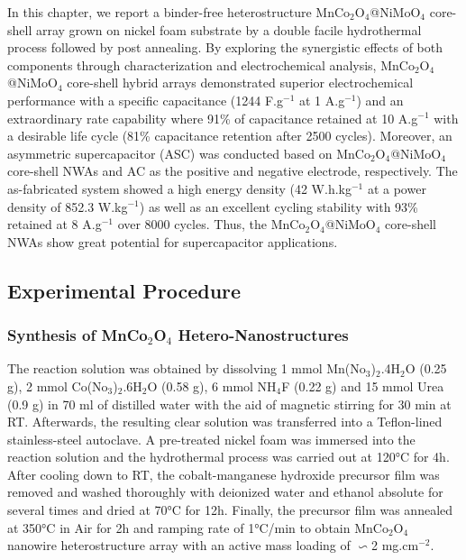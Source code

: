 \documentclass[reprint,amsmath,amssymb,aps,floatfix,
]{revtex4-2}
\begin{document}
In this chapter, we report a binder-free heterostructure MnCo$_2$O$_4$@NiMoO$_4$ core-shell array grown on nickel foam substrate by a double facile hydrothermal process followed by post annealing. By exploring the synergistic effects of both components through characterization and electrochemical analysis, MnCo$_2$O$_4$@NiMoO$_4$ core-shell hybrid arrays demonstrated superior electrochemical performance with a specific capacitance (1244 F.g$^{-1}$ at  1 A.g$^{-1}$) and an extraordinary rate capability where 91\% of capacitance retained at 10 A.g$^{-1}$ with a desirable life cycle (81\% capacitance retention after 2500 cycles). Moreover, an asymmetric supercapacitor (ASC) was conducted based on MnCo$_2$O$_4$@NiMoO$_4$ core-shell NWAs and AC as the positive and negative electrode, respectively. The as-fabricated system showed a high energy density (42 W.h.kg$^{-1}$ at a power density of 852.3 W.kg$^{-1}$) as well as an excellent cycling stability with 93\% retained at 8 A.g$^{-1}$ over 8000 cycles.  Thus, the MnCo$_2$O$_4$@NiMoO$_4$ core-shell NWAs show great potential for supercapacitor applications.
\subsection{\label{sec:level3}Experimental Procedure}
\subsubsection{Synthesis of MnCo$_2$O$_4$ Hetero-Nanostructures}
The reaction solution was obtained by dissolving 1 mmol Mn(No$_3$)$_2$.4H$_2$O (0.25 g), 2 mmol Co(No$_3$)$_2$.6H$_2$O (0.58 g), 6 mmol NH$_4$F (0.22 g) and 15 mmol Urea (0.9 g) in 70 ml of distilled water with the aid of magnetic stirring for 30 min at RT. Afterwards, the resulting clear solution was transferred into a Teflon-lined stainless-steel autoclave. A pre-treated nickel foam was immersed into the reaction solution and the hydrothermal process was carried out at \ang{120}C for 4h. After cooling down to RT, the cobalt-manganese hydroxide precursor film was removed and washed thoroughly with deionized water and ethanol absolute for several times and dried at \ang{70}C for 12h. Finally, the precursor film was annealed at \ang{350}C in Air for 2h and ramping rate of \ang{1}C/min to obtain MnCo$_2$O$_4$ nanowire heterostructure array with an active mass loading of $\backsim$2 mg.cm$^{-2}$.
\end{document}
